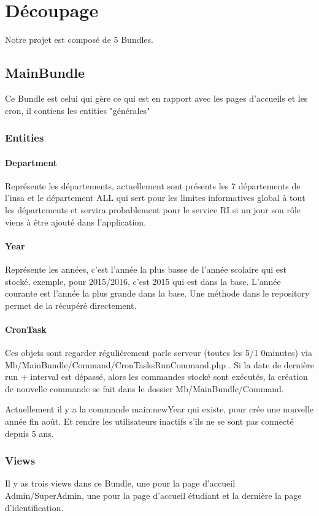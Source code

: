 
\chapter{Découpage}
Notre projet est composé de 5 Bundles.

\section{MainBundle}
Ce Bundle est celui qui gère ce qui est en rapport avec les pages d'accueils et les cron, il contiens les entities "générales"

\subsection{Entities}
\subsubsection{Department}
Représente les départements, actuellement sont présents les 7 départements de l'insa et le département ALL qui sert pour les limites informatives global à tout les départements et servira probablement pour le service RI si un jour son rôle viens à être ajouté dans l'application.

\subsubsection{Year}
Représente les années, c'est l'année la plus basse de l'année scolaire qui est stocké, exemple, pour 2015/2016, c'est 2015 qui est dans la base. L'année courante est l'année la plus grande dans la base. Une méthode dans le repository permet de la récupéré directement.

\subsubsection{CronTask}
Ces objets sont regarder régulièrement parle serveur (toutes les 5/1 0minutes) via  Mb/MainBundle/Command/CronTasksRunCommand.php . 
Si la date de dernière run + interval est dépassé, alors les commandes stocké sont exécutés, la création de nouvelle commande se fait dans le dossier Mb/MainBundle/Command. 

Actuellement il y a la commande main:newYear qui existe, pour crée une nouvelle année fin août. Et rendre les utilisateurs inactifs s'ils ne se sont pas connecté depuis 5 ans.


\subsection{Views}
Il y as trois views dans ce Bundle, une pour la page d'accueil Admin/SuperAdmin, une pour la page d'accueil étudiant et la dernière la page d'identification.

